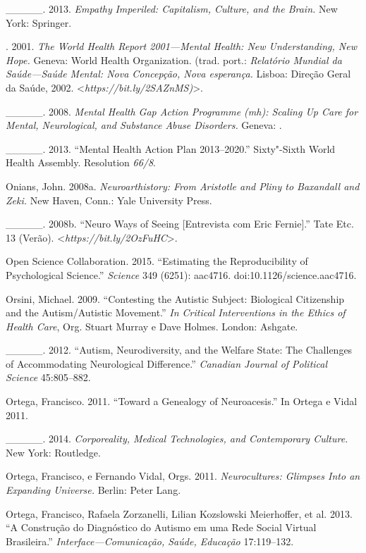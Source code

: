 {\begin{Parskip}
\_\_\_\_\_. 2013. \emph{Empathy} \emph{Imperiled: Capitalism, Culture,
and the Brain.} New York: Springer.

. 2001. \emph{The World Health Report 2001---Mental Health: New
Understanding, New Hope.} Geneva: World Health Organization. (trad.
port.: \emph{Relatório Mundial da Saúde---Saúde Mental: Nova Concepção,
Nova esperança.} Lisboa: Direção Geral da Saúde, 2002.
\textless{}\emph{https://bit.ly/2SAZnMS)}\textgreater{}.

\_\_\_\_\_. 2008. \emph{Mental Health Gap Action Programme (mh):
Scaling Up Care for Mental, Neurological, and Substance Abuse
Disorders.} Geneva: .

\_\_\_\_\_. 2013. ``Mental Health Action Plan 2013--2020.'' Sixty"-Sixth
World Health Assembly. Resolution \emph{66/8}.

Onians, John. 2008a. \emph{Neuroarthistory: From Aristotle and Pliny to
Baxandall and Zeki.} New Haven, Conn.: Yale University Press.

\_\_\_\_\_. 2008b. ``Neuro Ways of Seeing {[}Entrevista com Eric
Fernie{]}.'' Tate Etc. 13 (Verão).
\textless{}\emph{https://bit.ly/2OzFuHC}\textgreater{}.

Open Science Collaboration. 2015. ``Estimating the Reproducibility of
Psychological Science.'' \emph{Science} 349 (6251): aac4716.
doi:10.1126/science.aac4716.

Orsini, Michael. 2009. ``Contesting the Autistic Subject: Biological
Citizenship and the Autism/Autistic Movement.'' \emph{In Critical
Interventions in the Ethics of Health Care}, Org. Stuart Murray e Dave
Holmes. London: Ashgate.

\_\_\_\_\_. 2012. ``Autism, Neurodiversity, and the Welfare State: The
Challenges of Accommodating Neurological Difference.'' \emph{Canadian
Journal of Political Science} 45:805--882.

Ortega, Francisco. 2011. ``Toward a Genealogy of Neuroacesis.'' In
Ortega e Vidal 2011.

\_\_\_\_\_. 2014. \emph{Corporeality, Medical Technologies, and
Contemporary Culture.} New York: Routledge.

Ortega, Francisco, e Fernando Vidal, Orgs. 2011. \emph{Neurocultures:
Glimpses Into an Expanding Universe.} Berlin: Peter Lang.

Ortega, Francisco, Rafaela Zorzanelli, Lilian Kozslowski Meierhoffer, et
al. 2013. ``A Construção do Diagnóstico do Autismo em uma Rede Social
Virtual Brasileira.'' \emph{Interface---Comunicação, Saúde, Educação}
17:119--132.


\end{Parskip}}

